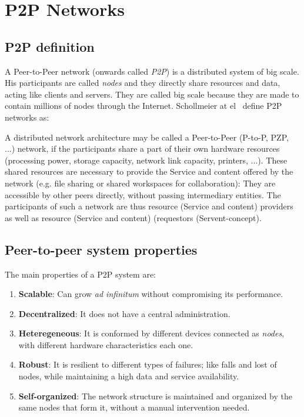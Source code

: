 %

\section{P2P Networks}
\subsection{P2P definition}
\label{sec:p2p_definition}

A Peer-to-Peer network (onwards called \textit{P2P}) is a distributed system of big scale. His participants
are called \textit{nodes} and they directly share resources and data, acting
like clients and servers. They are called big scale because they are made to
contain millions of nodes through the Internet. Schollmeier at
el~\cite{conf_p2p_Schollmeier01} define P2P networks as:

\begin{mydef}
A distributed network architecture may be called a Peer-to-Peer (P-to-P, PZP,
...) network, if the participants share a part of their own hardware resources (processing power, storage capacity, network link capacity, printers, ...). 
These shared resources are necessary to provide the Service and content offered
by the network (e.g.  file sharing or shared workspaces for collaboration):
They are accessible by other peers directly, without passing intermediary
entities. The participants of such a network are thus resource (Service and
content) providers as well as resource (Service and content) (requestors
(Servent-concept).
\end{mydef}

\subsection{Peer-to-peer system properties}
\label{sec:p2p_characteristics}

The main properties of a P2P system are:
\begin{enumerate}
    \item \textbf{Scalable}: Can grow \textit{ad infinitum} without compromising its performance.
    \item \textbf{Decentralized}: It does not have a central administration.
    \item \textbf{Heteregeneous}: It is conformed by different devices
connected as \textit{nodes}, with different hardware characteristics each one.
    \item \textbf{Robust}: It is resilient to different types of failures; like
falls and lost of nodes, while maintaining a high data and service availability.
    \item \textbf{Self-organized}: The network structure is maintained and organized by the same nodes that form it, without a manual intervention needed.
\end{enumerate}

